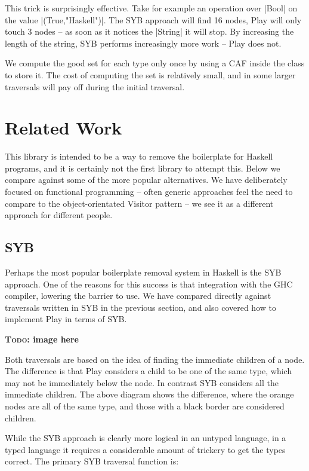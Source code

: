 \documentclass[preprint]{sigplanconf}
\newcommand{\todo}[1]{\textbf{\textsc{Todo:} #1}}
\begin{document}
This trick is surprisingly effective. Take for example an operation over |Bool| on the value |(True,"Haskell")|. The SYB approach will find 16 nodes, Play will only touch 3 nodes -- as soon as it notices the |String| it will stop. By increasing the length of the string, SYB performs increasingly more work -- Play does not.

We compute the good set for each type only once by using a CAF inside the class to store it. The cost of computing the set is relatively small, and in some larger traversals will pay off during the initial traversal.


\section{Related Work}
\label{sec:related}

This library is intended to be a way to remove the boilerplate for Haskell programs, and it is certainly not the first library to attempt this. Below we compare against some of the more popular alternatives. We have deliberately focused on functional programming -- often generic approaches feel the need to compare to the object-orientated Visitor pattern -- we see it as a different approach for different people.

\subsection{SYB}

Perhaps the most popular boilerplate removal system in Haskell is the SYB approach. One of the reasons for this success is that integration with the GHC compiler, lowering the barrier to use. We have compared directly against traversals written in SYB in the previous section, and also covered how to implement Play in terms of SYB.

\todo{image here}

Both traversals are based on the idea of finding the immediate children of a node. The difference is that Play considers a child to be one of the same type, which may not be immediately below the node. In contrast SYB considers all the immediate children. The above diagram shows the difference, where the orange nodes are all of the same type, and those with a black border are considered children.

While the SYB approach is clearly more logical in an untyped language, in a typed language it requires a considerable amount of trickery to get the types correct. The primary SYB traversal function is:
\end{document}
